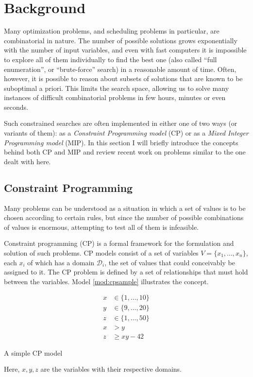 \documentclass[13pt, letterpaper, oneside]{book}
\begin{document}
\chapter{Background}
Many optimization problems, and scheduling problems in particular, are
combinatorial in nature. The number of possible solutions grows exponentially
with the number of input variables, and even with fast computers it is
impossible to explore all of them individually to find the best one
(also called ``full enumeration'', or ``brute-force'' search) in a reasonable
amount of time. Often, however, it is possible to reason about subsets of
solutions that are known to be suboptimal a priori. This limits the search
space, allowing us to solve many instances of difficult combinatorial problems
in few hours, minutes or even seconds.

Such constrained searches are often implemented in either one of two ways (or
variants of them): as a \textit{Constraint Programming model} (CP) or as a
\textit{Mixed Integer Programming model} (MIP). In this section I will briefly
introduce the concepts behind both CP and MIP and review recent work on problems
similar to the one dealt with here.

\section{Constraint Programming}

Many problems can be understood as a situation in which a set of values is to be
chosen according to certain rules, but since the number of possible combinations
of values is enormous, attempting to test all of them is infeasible.


Constraint programming (CP) is a formal framework for the formulation and
solution of such problems. CP models consist of a set of variables $V = \{x_1,
\dots, x_n\}$, each $x_i$ of which has a domain $\mathcal{D}_i$, the set of
values that could conceivably be assigned to it. The CP problem is defined by a
set of relationships that must hold between the variables. Model
\ref{mod:cpsample} illustrates the concept.

\begin{model}
\begin{align}
x &\in \{1,\dots,10\}\\
y &\in \{9,\dots,20\}\\
z &\in \{1,\dots,50\}\\
x &> y\\
z &\geq xy - 42
\end{align}
\caption{A simple CP model}
\label{mod:cpsample}
\end{model}
Here, $x, y, z$ are the variables with their respective domains.
\end{document}
